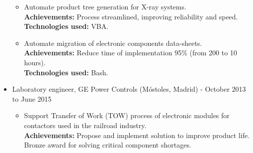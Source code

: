 \documentclass[11pt]{article}
\begin{document}
\begin{itemize}
\begin{itemize}
\item Automate product tree generation for X-ray systems.\\[0pt]
\textbf{Achievements:} Process streamlined, improving reliability and speed.\\[0pt]
\textbf{Technologies used:} VBA.\\[0pt]
\item Automate migration of electronic components data-sheets.\\[0pt]
\textbf{Achievements:} Reduce time of implementation 95\% (from 200 to 10 hours).\\[0pt]
\textbf{Technologies used:} Bash.\\[0pt]
\end{itemize}
\item Laboratory engineer, GE Power Controls (Móstoles, Madrid) - October 2013 to June 2015\\[0pt]
\begin{itemize}
\item Support Transfer of Work (TOW) process of electronic modules for contactors used in the railroad industry.\\[0pt]
\textbf{Achievements:} Propose and implement solution to improve product life. Bronze award for solving critical component shortages.\\[0pt]
\end{itemize}
\end{itemize}
\end{document}
